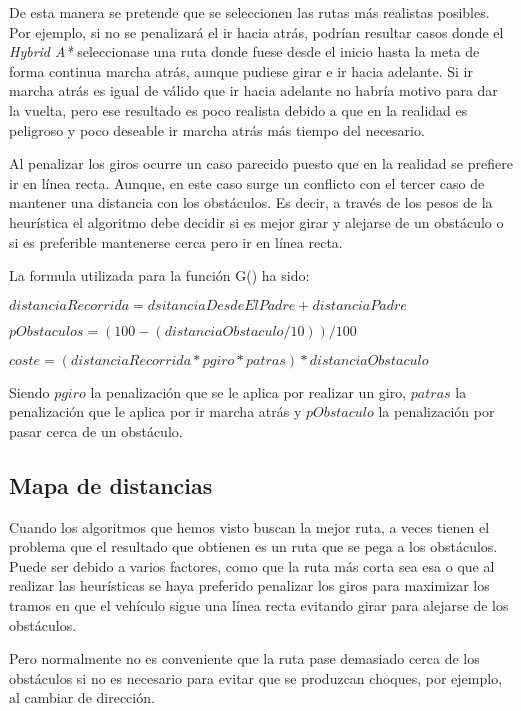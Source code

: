 De esta manera se pretende que se seleccionen las rutas más realistas posibles. Por ejemplo, si no se penalizará el ir hacia atrás, podrían resultar casos donde el \textit{Hybrid A*} seleccionase una ruta donde fuese desde el inicio hasta la meta de forma continua marcha atrás, aunque pudiese girar e ir hacia adelante. Si ir marcha atrás es igual de válido que ir hacia adelante no habría motivo para dar la vuelta, pero ese resultado es poco realista debido a que en la realidad es peligroso y poco deseable ir marcha atrás más tiempo del necesario.

Al penalizar los giros ocurre un caso parecido puesto que en la realidad se prefiere ir en línea recta. Aunque, en este caso surge un conflicto con el tercer caso de mantener una distancia con los obstáculos. Es decir, a través de los pesos de la heurística el algoritmo debe decidir si es mejor girar y alejarse de un obstáculo o si es preferible mantenerse cerca pero ir en línea recta.

La formula utilizada para la función G() ha sido:
\begin{center}
$distanciaRecorrida = dsitanciaDesdeElPadre + distanciaPadre$

$pObstaculos = (100-(distanciaObstaculo/10))/100$

$coste = (distanciaRecorrida * pgiro * patras) * distanciaObstaculo$
\end{center}

Siendo $pgiro$ la penalización que se le aplica por realizar un giro, $patras$ la penalización que le aplica por ir marcha atrás y $pObstaculo$ la penalización por pasar cerca de un obstáculo.

\subsection{Mapa de distancias} \label{mapadistancias}
Cuando los algoritmos que hemos visto buscan la mejor ruta, a veces tienen el problema que el resultado que obtienen es un ruta que se pega a los obstáculos. Puede ser debido a varios factores, como que la ruta más corta sea esa o que al realizar las heurísticas se haya preferido penalizar los giros para maximizar los tramos en que el vehículo sigue una línea recta evitando girar para alejarse de los obstáculos.

Pero normalmente no es conveniente que la ruta pase demasiado cerca de los obstáculos si no es necesario para evitar que se produzcan choques, por ejemplo, al cambiar de dirección.

